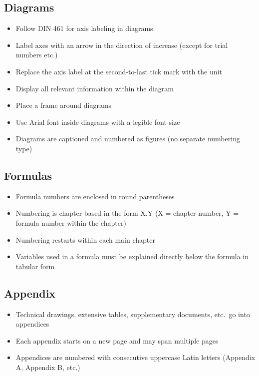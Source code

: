 \subsection{Diagrams}
\begin{itemize}
    \item Follow DIN 461 for axis labeling in diagrams
    \item Label axes with an arrow in the direction of increase (except for trial numbers etc.)
    \item Replace the axis label at the second-to-last tick mark with the unit
    \item Display all relevant information within the diagram
    \item Place a frame around diagrams
    \item Use Arial font inside diagrams with a legible font size
    \item Diagrams are captioned and numbered as figures (no separate numbering type)
\end{itemize}

\subsection{Formulas}
\begin{itemize}
    \item Formula numbers are enclosed in round parentheses
    \item Numbering is chapter-based in the form X.Y (X = chapter number, Y = formula number within the chapter)
    \item Numbering restarts within each main chapter
    \item Variables used in a formula must be explained directly below the formula in tabular form
\end{itemize}

\subsection{Appendix}
\begin{itemize}
    \item Technical drawings, extensive tables, supplementary documents, etc.\ go into appendices
    \item Each appendix starts on a new page and may span multiple pages
    \item Appendices are numbered with consecutive uppercase Latin letters (Appendix A, Appendix B, etc.)
\end{itemize}


